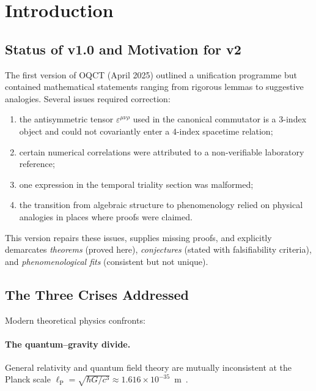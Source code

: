 \documentclass[11pt,a4paper]{article}
\theoremstyle{myrmk}
\newcommand{\lP}{\ell_{\mathrm{P}}}
\begin{document}

\section{Introduction}
\label{sec:intro}

\subsection{Status of v1.0 and Motivation for v2}

The first version of OQCT (April 2025) outlined a unification programme but contained
mathematical statements ranging from rigorous lemmas to suggestive analogies. Several
issues required correction:
\begin{enumerate}[label=(\alph*),leftmargin=*]
  \item the antisymmetric tensor $\varepsilon^{\mu\nu\rho}$ used in the canonical
    commutator is a $3$-index object and could not covariantly enter a $4$-index
    spacetime relation;
  \item certain numerical correlations were attributed to a non-verifiable laboratory
    reference;
  \item one expression in the temporal triality section was malformed;
  \item the transition from algebraic structure to phenomenology relied on physical
    analogies in places where proofs were claimed.
\end{enumerate}
This version repairs these issues, supplies missing proofs, and explicitly demarcates
\emph{theorems} (proved here), \emph{conjectures} (stated with falsifiability
criteria), and \emph{phenomenological fits} (consistent but not unique).

\subsection{The Three Crises Addressed}

Modern theoretical physics confronts:

\paragraph{The quantum--gravity divide.} General relativity and quantum field theory
are mutually inconsistent at the Planck scale $\lP=\sqrt{\hbar G/c^3}\approx
1.616\times 10^{-35}$~m~\cite{Donoghue1994}.
\end{document}
